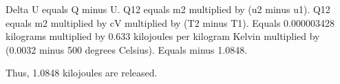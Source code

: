 Delta U equals Q minus U.  
Q12 equals m2 multiplied by (u2 minus u1).  
Q12 equals m2 multiplied by cV multiplied by (T2 minus T1).  
Equals 0.000003428 kilograms multiplied by 0.633 kilojoules per kilogram Kelvin multiplied by (0.0032 minus 500 degrees Celsius).  
Equals minus 1.0848.  

Thus, 1.0848 kilojoules are released.